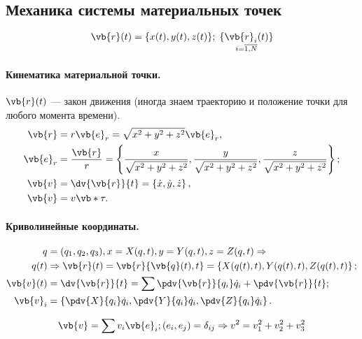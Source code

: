 \subsection{Механика системы материальных точек}
\begin{equation*}
\vb{r}(t) = \{x(t), y(t), z(t) \}; \thickspace \mathop{\{\vb{r}_i(t)\}}\limits_{i = \overline{1{,}N}}
\end{equation*}  

\paragraph{Кинематика материальной точки.}
$\vb{r}(t)$ --- закон движения (иногда знаем траекторию и положение точки для любого момента времени). 
\begin{align*}
\vb{r} &= r \vb{e}_r = \sqrt{x^2 + y^2 + z^2} \vb{e}_r, \\
\vb{e}_r &= \frac{\vb{r}}{r} = \left\{ \frac{x}{\sqrt{x^2 + y^2 + z^2}}, \frac{y}{\sqrt{x^2 + y^2 + z^2}}, \frac{z}{\sqrt{x^2 + y^2 + z^2}} \right\};\\
\vb{v} &= \dv{\vb{r}}{t} = \left\{\dot x, \dot y, \dot z\right\},\\
\vb{v} &= v \vb*{\tau}.
\end{align*}

\paragraph{Криволинейные координаты.}
\begin{align*}
q &= (q_1, q_2, q_3), x =X(q, t), y = Y(q, t), z =Z(q, t) \Rightarrow \\
q(t) &\Rightarrow \vb{r}(t) = \vb{r}{\vb{q}(t), t} = \left\{X(q(t), t), Y(q(t), t), Z(q(t), t)\right\}; \\
\vb{v}(t) &= \dv{\vb{r}}{t} = \sum \pdv{\vb{r}}{q_i} \dot q_i + \pdv{\vb{r}}{t}; \\
\vb{v}_i &= \left\{\pdv{X}{q_i} \dot q_i, \pdv{Y}{q_i} \dot q_i, \pdv{Z}{q_i} \dot q_i \right\}.
\end{align*}

\begin{equation*}
\vb{v} = \sum v_i \vb{e}_i; (e_i, e_j) = \delta_{ij} \Rightarrow v^2 = v_1^2 + v_2^2 + v_3^2
\end{equation*}

